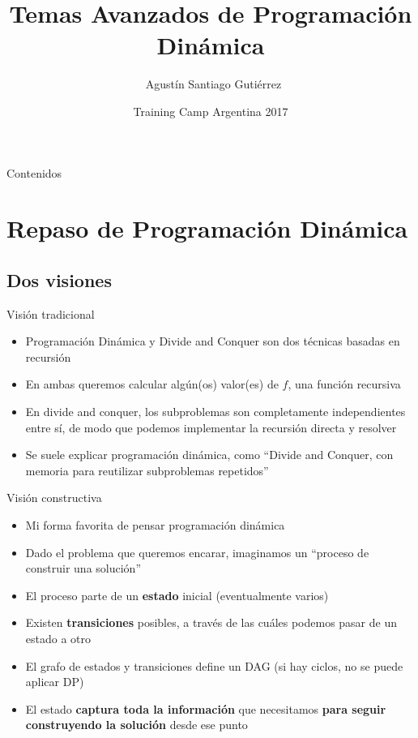 \documentclass{beamer}
\title[DP Avanzada] %
{Temas Avanzados de Programación Dinámica}
\author[Agustín Gutiérrez] %
{~Agustín Santiago Gutiérrez}
\institute[UBA] %
{
  Facultad de Ciencias Exactas y Naturales\\
  Universidad de Buenos Aires
}
\date[TC 2017] %
{Training Camp Argentina 2017}
\begin{document}
\begin{frame}
  \titlepage
\end{frame}

\begin{frame}{Contenidos}
  \tableofcontents
\end{frame}



\section{Repaso de Programación Dinámica}

\subsection{Dos visiones}

\begin{frame}{Visión tradicional}
	\begin{itemize}
		\item Programación Dinámica y Divide and Conquer son dos técnicas basadas en recursión
		\item En ambas queremos calcular algún(os) valor(es) de $f$, una función recursiva
		\item En divide and conquer, los subproblemas son completamente independientes entre sí, de modo que podemos implementar la recursión directa y resolver
		\item Se suele explicar programación dinámica, como ``Divide and Conquer, con memoria para reutilizar subproblemas repetidos''
	\end{itemize}
\end{frame}

\begin{frame}{Visión constructiva}
	\begin{itemize}
		\item Mi forma favorita de pensar programación dinámica
		\item Dado el problema que queremos encarar, imaginamos un ``proceso de construir una solución''
		\item El proceso parte de un \textbf{estado} inicial (eventualmente varios)
		\item Existen \textbf{transiciones} posibles, a través de las cuáles podemos pasar de un estado a otro
		\item El grafo de estados y transiciones define un DAG (si hay ciclos, no se puede aplicar DP)
		\item El estado \textbf{captura toda la información} que necesitamos \textbf{para seguir construyendo la solución} desde ese punto
	\end{itemize}
\end{frame}
\end{document}
